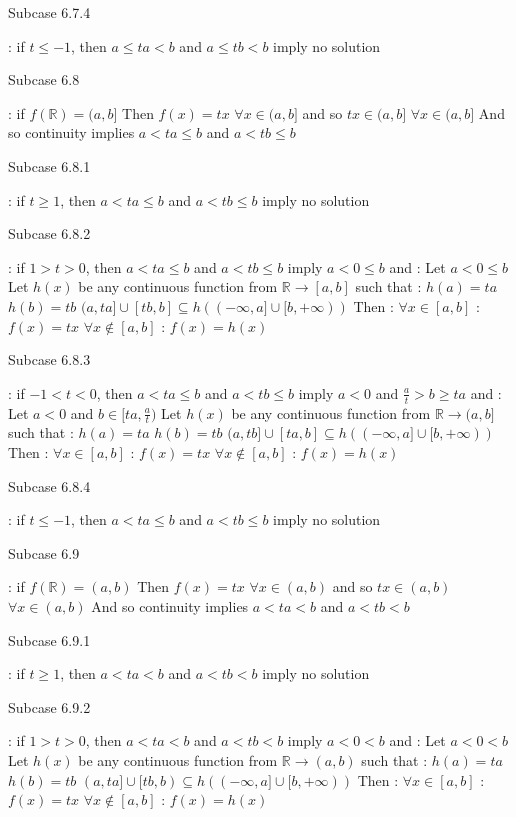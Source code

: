 \begin{solution}
\begin{tcolorbox}
\begin{bolded}Subcase 6.7.4\end{bolded} : if $t\le -1$, then $a\le ta< b$ and $a\le tb< b$ imply no solution

\begin{bolded}Subcase 6.8\end{bolded} : if $f(\mathbb R)=(a,b]$
Then $f(x)=tx$ $\forall x\in (a,b]$ and so $tx\in(a,b]$ $\forall x\in(a,b]$
And so continuity implies $a< ta\le b$ and $a< tb\le b$

\begin{bolded}Subcase 6.8.1\end{bolded} : if $t\ge 1$, then $a< ta\le b$ and $a< tb\le b$ imply no solution

\begin{bolded}Subcase 6.8.2\end{bolded} : if $1>t>0$, then $a< ta\le b$ and $a< tb\le b$ imply $a<0\le b$ and :
Let $a< 0\le b$
Let $h(x)$ be any continuous function from $\mathbb R\to[a,b]$ such that :
$h(a)=ta$
$h(b)=tb$
$(a,ta]\cup[tb,b]\subseteq h((-\infty,a]\cup[b,+\infty))$
Then :
$\forall x\in[a,b]$ : $f(x)=tx$
$\forall x\notin[a,b]$ : $f(x)=h(x)$

\begin{bolded}Subcase 6.8.3\end{bolded} : if $-1<t<0$, then $a< ta\le b$ and $a< tb\le b$ imply $a< 0$ and $\frac at> b\ge ta$ and :
Let $a< 0$ and $b\in[ta,\frac at)$
Let $h(x)$ be any continuous function from $\mathbb R\to(a,b]$ such that :
$h(a)=ta$
$h(b)=tb$
$(a,tb]\cup[ta,b]\subseteq h((-\infty,a]\cup[b,+\infty))$
Then :
$\forall x\in[a,b]$ : $f(x)=tx$
$\forall x\notin[a,b]$ : $f(x)=h(x)$

\begin{bolded}Subcase 6.8.4\end{bolded} : if $t\le -1$, then $a< ta\le b$ and $a< tb\le b$ imply no solution

\begin{bolded}Subcase 6.9\end{bolded} : if $f(\mathbb R)=(a,b)$
Then $f(x)=tx$ $\forall x\in (a,b)$ and so $tx\in(a,b)$ $\forall x\in(a,b)$
And so continuity implies $a< ta< b$ and $a< tb< b$

\begin{bolded}Subcase 6.9.1\end{bolded} : if $t\ge 1$, then $a< ta<b$ and $a< tb< b$ imply no solution

\begin{bolded}Subcase 6.9.2\end{bolded} : if $1>t>0$, then $a< ta<b$ and $a< tb< b$ imply $a< 0< b$ and :
Let $a< 0< b$
Let $h(x)$ be any continuous function from $\mathbb R\to(a,b)$ such that :
$h(a)=ta$
$h(b)=tb$
$(a,ta]\cup[tb,b)\subseteq h((-\infty,a]\cup[b,+\infty))$
Then :
$\forall x\in[a,b]$ : $f(x)=tx$
$\forall x\notin[a,b]$ : $f(x)=h(x)$


\end{tcolorbox}
\end{solution}
